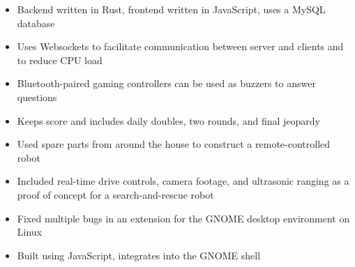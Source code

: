 \smallskip
\smallskip
{}
\begin{itemize}
\item Backend written in Rust, frontend written in JavaScript, uses a MySQL database
\item Uses Websockets to facilitate communication between server and clients and to reduce CPU load
\end{itemize}
\smallskip
\smallskip
{}
\begin{itemize}
\item Bluetooth-paired gaming controllers can be used as buzzers to answer questions
\item Keeps score and includes daily doubles, two rounds, and final jeopardy
\end{itemize}
\smallskip
\smallskip
{}
\begin{itemize}
\item Used spare parts from around the house to construct a remote-controlled robot
\item Included real-time drive controls, camera footage, and ultrasonic ranging as a proof of concept for a search-and-rescue robot
\end{itemize}
\smallskip
\smallskip
{}
\begin{itemize}
\item Fixed multiple bugs in an extension for the GNOME desktop environment on Linux
\item Built using JavaScript, integrates into the GNOME shell
\end{itemize}
%
